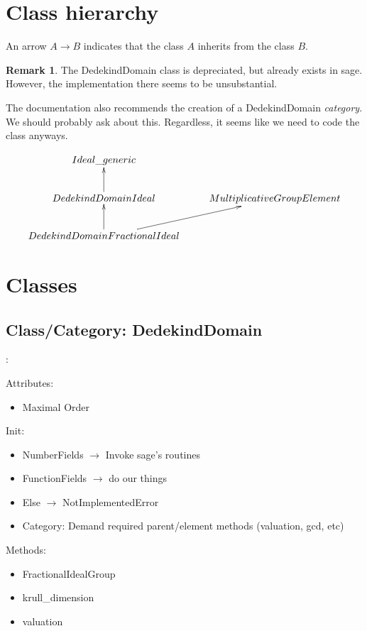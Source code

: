 \documentclass{amsart}
\theoremstyle{definition}
\newtheorem*{remark*}{Remark}
\begin{document}
	\section{Class hierarchy}
	
	An arrow $A \longrightarrow B$ indicates that the class $A$ inherits from the class $B$.
	
	\begin{remark*}
		The DedekindDomain class is depreciated, but already exists in sage. However, the implementation there seems to be unsubstantial. 
		
		The documentation also recommends the creation of a DedekindDomain \emph{category}. We should probably ask about this. Regardless, it seems like we need to code the class anyways.
	\end{remark*}
	
	\[
		\xymatrix{
			Ideal\_generic \\
			DedekindDomainIdeal \ar[u] & MultiplicativeGroupElement \\
			DedekindDomainFractionalIdeal \ar[ur] \ar[u]
		}
	\]
	
	\section{Classes}

	\subsection{Class/Category: DedekindDomain}: \newline
		
		Attributes:
		\begin{itemize}
			\item 
			Maximal Order
		\end{itemize}
	
		Init:
		\begin{itemize}
			\item
			NumberFields $\rightarrow$ Invoke sage's routines
			\item
			FunctionFields $\rightarrow$ do our things
			\item
			Else $\rightarrow$ NotImplementedError
			\item
			Category: Demand required parent/element methods (valuation, gcd, etc)
		\end{itemize}
	
		Methods:
		\begin{itemize}
			\item 
			FractionalIdealGroup
			\item
			krull\_dimension
			\item
			valuation
		\end{itemize}
\end{document}
